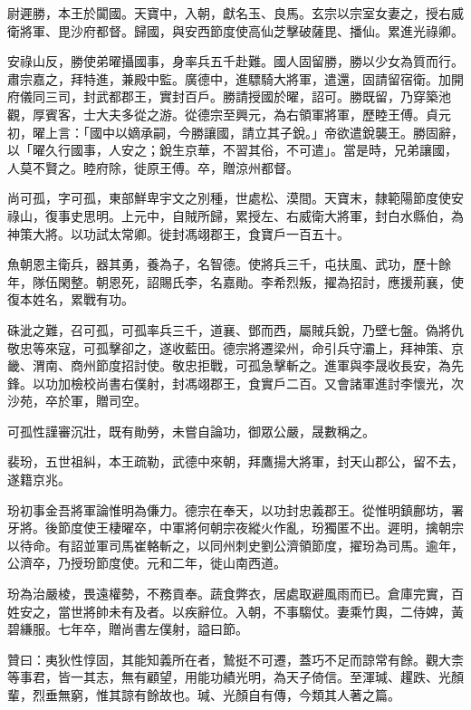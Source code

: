 \begin{pinyinscope}
 尉遲勝，本王於闐國。天寶中，入朝，獻名玉、良馬。玄宗以宗室女妻之，授右威衛將軍、毘沙府都督。歸國，與安西節度使高仙芝擊破薩毘、播仙。累進光祿卿。



 安祿山反，勝使弟曜攝國事，身率兵五千赴難。國人固留勝，勝以少女為質而行。肅宗嘉之，拜特進，兼殿中監。廣德中，進驃騎大將軍，遣還，固請留宿衛。加開府儀同三司，封武都郡王，實封百戶。勝請授國於曜，詔可。勝既留，乃穿築池觀，厚賓客，士大夫多從之游。從德宗至興元，為右領軍將軍，歷睦王傅。貞元初，曜上言：「國中以嫡承嗣，今勝讓國，請立其子銳。」帝欲遣銳襲王。勝固辭，以「曜久行國事，人安之；銳生京華，不習其俗，不可遣」。當是時，兄弟讓國，人莫不賢之。睦府除，徙原王傅。卒，贈涼州都督。



 尚可孤，字可孤，東部鮮卑宇文之別種，世處松、漠間。天寶末，隸範陽節度使安祿山，復事史思明。上元中，自賊所歸，累授左、右威衛大將軍，封白水縣伯，為神策大將。以功試太常卿。徙封馮翊郡王，食寶戶一百五十。



 魚朝恩主衛兵，器其勇，養為子，名智德。使將兵三千，屯扶風、武功，歷十餘年，隊伍閑整。朝恩死，詔賜氏李，名嘉勛。李希烈叛，擢為招討，應援荊襄，使復本姓名，累戰有功。



 硃泚之難，召可孤，可孤率兵三千，道襄、鄧而西，屬賊兵銳，乃壁七盤。偽將仇敬忠等來寇，可孤擊卻之，遂收藍田。德宗將遷梁州，命引兵守灞上，拜神策、京畿、渭南、商州節度招討使。敬忠拒戰，可孤急擊斬之。進軍與李晟收長安，為先鋒。以功加檢校尚書右僕射，封馮翊郡王，食實戶二百。又會諸軍進討李懷光，次沙苑，卒於軍，贈司空。



 可孤性謹審沉壯，既有勛勞，未嘗自論功，御眾公嚴，晟數稱之。



 裴玢，五世祖糾，本王疏勒，武德中來朝，拜鷹揚大將軍，封天山郡公，留不去，遂籍京兆。



 玢初事金吾將軍論惟明為傔力。德宗在奉天，以功封忠義郡王。從惟明鎮鄜坊，署牙將。後節度使王棲曜卒，中軍將何朝宗夜縱火作亂，玢獨匿不出。遲明，擒朝宗以待命。有詔並軍司馬崔輅斬之，以同州刺史劉公濟領節度，擢玢為司馬。逾年，公濟卒，乃授玢節度使。元和二年，徙山南西道。



 玢為治嚴棱，畏遠權勢，不務貢奉。蔬食弊衣，居處取避風雨而已。倉庫完實，百姓安之，當世將帥未有及者。以疾辭位。入朝，不事騶仗。妻乘竹輿，二侍婢，黃碧縑服。七年卒，贈尚書左僕射，謚曰節。



 贊曰：夷狄性惇固，其能知義所在者，鷙挺不可遷，蓋巧不足而諒常有餘。觀大柰等事君，皆一其志，無有顧望，用能功績光明，為天子倚信。至渾瑊、趯跌、光顏輩，烈垂無窮，惟其諒有餘故也。瑊、光顏自有傳，今類其人著之篇。



\end{pinyinscope}